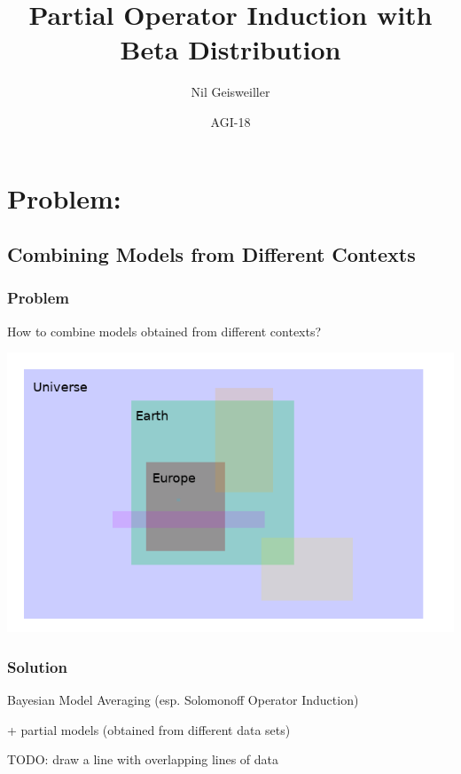 \documentclass{beamer}
\title{Partial Operator Induction with Beta Distribution}
\author{Nil Geisweiller}
\institute[SingularityNET OpenCog Foundations] %
{
  SingularityNET\\
  OpenCog Foundations
}
\date[AGI-18] %
{AGI-18}
\begin{document}
\frame
{
  \maketitle
}
\section[Outline]{}
\frame{\tableofcontents}

\section{Problem:}
\subsection{Combining Models from Different Contexts}

\begin{frame}[fragile]
  \frametitle{Problem}

  How to combine models obtained from different contexts?

  \includegraphics[scale=0.5]{images/Europe_Earth_Universe.png}
\end{frame}


\begin{frame}[fragile]
  \frametitle{Solution}

  Bayesian Model Averaging (esp. Solomonoff Operator Induction)

  + partial models (obtained from different data sets)

  TODO: draw a line with overlapping lines of data
\end{frame}
\end{document}
